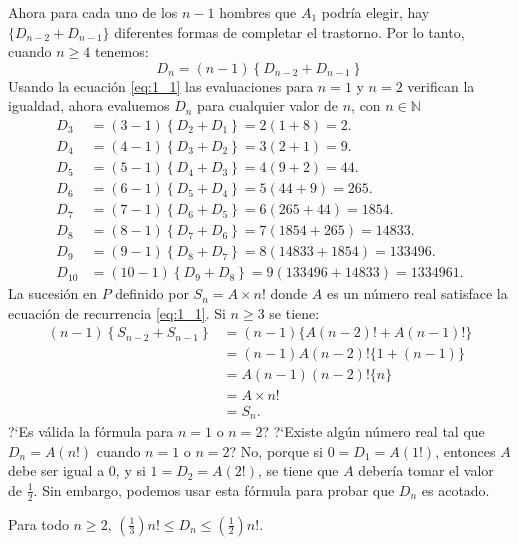 \begin{example}
	Ahora para cada uno de los $n-1$ hombres que $A_{1}$ podría elegir, hay $\{D_{n-2}+ D_{n-1}\}$ diferentes formas de completar el trastorno. Por lo tanto, cuando $n\geq 4$ tenemos:
\begin{equation}\label{eq:1_1}
D_{n}=\left(n-1\right)\left\{D_{n-2}+D_{n-1}\right\}
\end{equation}
Usando la ecuación \eqref{eq:1_1} las evaluaciones para $n=1$ y $n=2$ verifican la igualdad, ahora evaluemos $D_{n}$ para cualquier valor de $n$, con $n\in\mathds{N}$
\begin{align*}
D_{3}&=\left(3-1\right)\left\{D_{2}+D_{1}\right\}=2\left(1+8\right)=2.\\
D_{4}&=\left(4-1\right)\left\{D_{3}+D_{2}\right\}=3\left(2+1\right)=9.\\
D_{5}&=\left(5-1\right)\left\{D_{4}+D_{3}\right\}=4\left(9+2\right)=44.\\
D_{6}&=(6-1)\left\{D_{5}+D_{4}\right\}=5\left(44 + 9\right)=265.\\
D_{7}&=\left(7-1\right)\left\{D_{6}+D_{5}\right\}=6\left(265+44\right)=1854.\\
D_{8}&=\left(8-1\right)\left\{D_{7}+D_{6}\right\}=7\left(1854+265\right)=14833.\\
D_{9}&=\left(9-1\right)\left\{D_{8}+D_{7}\right\}=8\left(14833+1854\right)=133496.\\
D_{10}&=\left(10-1\right)\left\{D_{9}+D_{8}\right\}=9\left(133496+14833\right)=1334961.
\end{align*}
La sucesión en $P$ definido por $S_{n}=A\times n!$ donde $A$ es un número real satisface la ecuación de recurrencia \eqref{eq:1_1}. Si $n\geq3$ se tiene:
\begin{align*}
	\left(n-1\right)\left\{S_{n-2}+S_{n-1}\right\}
	&=(n-1)\{A(n-2)!+A(n-1)!\} \\
	&=(n-1)A(n-2)!\{1+(n-1)\} \\
	&=A(n-1)(n-2)!\{n\}\\
	&=A\times n!\\
	&=S_{n}.
\end{align*}
?`Es válida la fórmula para $n=1$ o $n=2$? ?`Existe algún número real tal que $D_{n}=A(n!)$ cuando $n=1$ o $n=2$? No, porque si $0=D_{1}=A(1!)$, entonces $A$ debe ser igual a $0$, y si $1=D_{2}=A(2!)$, se tiene que $A$ debería tomar el valor de $\frac{1}{2}$. Sin embargo, podemos usar esta fórmula para probar que $D_{n}$ es acotado.
\end{example}

\begin{theorem}{}
Para todo $n\geq 2$, $\left(\frac{1}{3}\right)n!\leq D_{n}\leq\left(\frac{1}{2}\right)n!$.
\end{theorem}

